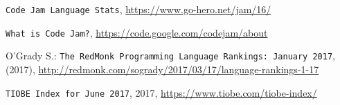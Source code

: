 \documentclass{article}
\begin{document}
\begin{multicols*}{2}
\begin{thebibliography}{1}
\raggedright \texttt{Code Jam Language Stats}, \url{https://www.go-hero.net/jam/16/}

\raggedright \texttt{What is Code Jam?}, \url{https://code.google.com/codejam/about}

\raggedright
O'Grady S.: \texttt{The RedMonk Programming Language Rankings: January 2017}, (2017), \url{http://redmonk.com/sogrady/2017/03/17/language-rankings-1-17}


\raggedright \texttt{TIOBE Index for June 2017}, 2017, \url{https://www.tiobe.com/tiobe-index/}

\end{thebibliography}

\end{multicols*}
\end{document}
